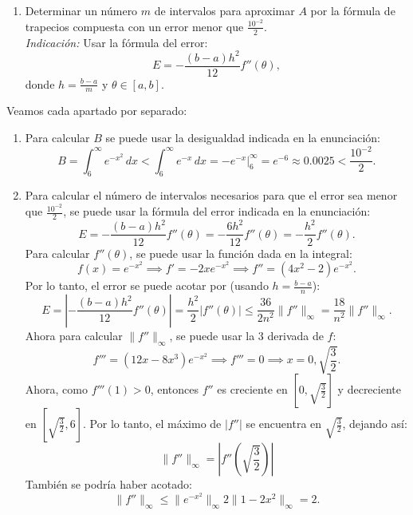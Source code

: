 {\begin{enumerate}[label=\alph*)]
  \item Determinar un número $m$ de intervalos para aproximar $A$ por la fórmula de trapecios compuesta con un error menor que $\frac{10^{-2}}{2}$. \\
  \textit{Indicación:} Usar la fórmula del error:
  \begin{equation*}
  E = -\frac{(b-a)h^2}{12} f''(\theta),
  \end{equation*}
  donde $h = \frac{b-a}{m}$ y $\theta \in [a,b]$.
\end{enumerate}
}{%
%
    Veamos cada apartado por separado:
    \begin{enumerate}[label=\alph*)]
        \item Para calcular $B$ se puede usar la desigualdad indicada en la enunciación:
        \[
            B = \int_6^\infty e^{-x^2} \, dx < \int_6^\infty e^{-x} \, dx =
            -e^{-x} \Big|_6^\infty = e^{-6} \approx 0.0025 < \frac{10^{-2}}{2}.
        \]
        \item Para calcular el número de intervalos necesarios para que el error sea menor que $\frac{10^{-2}}{2}$, se puede usar la fórmula del error indicada en la enunciación:
        \[
            E = -\frac{(b-a)h^2}{12} f''(\theta) = -\frac{6h^2}{12} f''(\theta) = -\frac{h^2}{2} f''(\theta).
        \]
        Para calcular $f''(\theta)$, se puede usar la función dada en la integral:
        \[
            f(x) = e^{-x^2} \implies
            f' = -2xe^{-x^2} \implies
            f'' = (4x^2 - 2)e^{-x^2}.
        \]
        Por lo tanto, el error se puede acotar por (usando $h=\frac{b-a}{n}$):
        \[
            E = \left| - \frac{(b-a)h^2}{12} f''(\theta) \right| = 
            \frac{h^2}{2} |f''(\theta)| \leq \frac{36}{2n^2} \| f''\|_\infty = \frac{18}{n^2} \|f''\|_\infty.
        \]
        Ahora para calcular $\|f''\|_\infty$, se puede usar la 3 derivada de $f$:
        \[
            f''' = (12x - 8x^3)e^{-x^2} \implies
            f''' = 0 \implies
            x = 0, \sqrt{\frac{3}{2}}.
        \]
        Ahora, como $f'''(1) > 0$, entonces $f''$ es creciente en $[0, \sqrt{\frac{3}{2}}]$ y decreciente en $[\sqrt{\frac{3}{2}}, 6]$. Por lo tanto, el máximo de $|f''|$ se encuentra en $\sqrt{\frac{3}{2}}$, dejando así:
        \[
            \|f''\|_\infty = |f''(\sqrt{\frac{3}{2}})|
        \]
        También se podría haber acotado:
        \[
            \|f''\|_\infty \leq \|e^{-x^2} \|_\infty 2 \| 1 - 2x^2 \|_\infty = 2.
        \]
    \end{enumerate}
}

